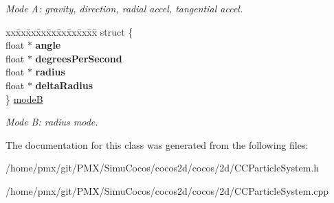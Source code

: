 \begin{DoxyCompactItemize}
\begin{tabbing}
\end{tabbing}\begin{DoxyCompactList}\small\item\em Mode A\+: gravity, direction, radial accel, tangential accel. \end{DoxyCompactList}\item 
\mbox{\label{classParticleData_ab3a8c6d147496c3050731d74a0057932}} 
\begin{tabbing}
xx\=xx\=xx\=xx\=xx\=xx\=xx\=xx\=xx\=\kill
struct \{\\
\>float $\ast$ {\bfseries angle}\\
\>float $\ast$ {\bfseries degreesPerSecond}\\
\>float $\ast$ {\bfseries radius}\\
\>float $\ast$ {\bfseries deltaRadius}\\
\} \hyperlink{classParticleData_ab3a8c6d147496c3050731d74a0057932}{modeB}\\

\end{tabbing}\begin{DoxyCompactList}\small\item\em Mode B\+: radius mode. \end{DoxyCompactList}\end{DoxyCompactItemize}


The documentation for this class was generated from the following files\+:\begin{DoxyCompactItemize}
\item 
/home/pmx/git/\+P\+M\+X/\+Simu\+Cocos/cocos2d/cocos/2d/C\+C\+Particle\+System.\+h\item 
/home/pmx/git/\+P\+M\+X/\+Simu\+Cocos/cocos2d/cocos/2d/C\+C\+Particle\+System.\+cpp\end{DoxyCompactItemize}
